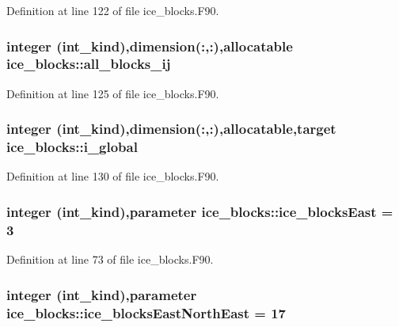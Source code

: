 Definition at line 122 of file ice\_\-blocks.F90.\hypertarget{namespaceice__blocks_a688487df478314a2bfdd431e7fd741f2}{
\subsubsection[{all\_\-blocks\_\-ij}]{\setlength{\rightskip}{0pt plus 5cm}integer (int\_\-kind),dimension(:,:),allocatable {\bf ice\_\-blocks::all\_\-blocks\_\-ij}}}
\label{namespaceice__blocks_a688487df478314a2bfdd431e7fd741f2}


Definition at line 125 of file ice\_\-blocks.F90.\hypertarget{namespaceice__blocks_a5a6a14070030778ba9fcbcaa8dc2fb0d}{
\subsubsection[{i\_\-global}]{\setlength{\rightskip}{0pt plus 5cm}integer (int\_\-kind),dimension(:,:),allocatable,target {\bf ice\_\-blocks::i\_\-global}}}
\label{namespaceice__blocks_a5a6a14070030778ba9fcbcaa8dc2fb0d}


Definition at line 130 of file ice\_\-blocks.F90.\hypertarget{namespaceice__blocks_a8e54c9ed562029d5b5e55d9a5b9ed00e}{
\subsubsection[{ice\_\-blocksEast}]{\setlength{\rightskip}{0pt plus 5cm}integer (int\_\-kind),parameter {\bf ice\_\-blocks::ice\_\-blocksEast} = 3}}
\label{namespaceice__blocks_a8e54c9ed562029d5b5e55d9a5b9ed00e}


Definition at line 73 of file ice\_\-blocks.F90.\hypertarget{namespaceice__blocks_a84cf6b8a9b39a3d0b6c331832650fe43}{
\subsubsection[{ice\_\-blocksEastNorthEast}]{\setlength{\rightskip}{0pt plus 5cm}integer (int\_\-kind),parameter {\bf ice\_\-blocks::ice\_\-blocksEastNorthEast} = 17}}
\label{namespaceice__blocks_a84cf6b8a9b39a3d0b6c331832650fe43}



